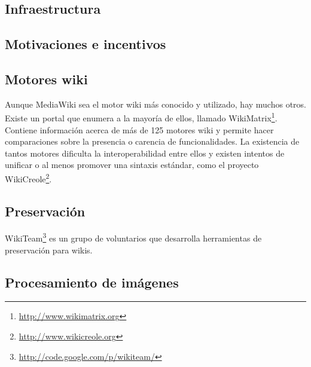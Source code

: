 \documentclass[11pt,onecolumn]{article}
\begin{document}
\subsection{Infraestructura}




\subsection{Motivaciones e incentivos}



\subsection{Motores wiki}

Aunque MediaWiki sea el motor wiki más conocido y utilizado, hay muchos otros. Existe un portal que enumera a la mayoría de ellos, llamado WikiMatrix\footnote{\href{http://www.wikimatrix.org}{http://www.wikimatrix.org}}. Contiene información acerca de más de 125 motores wiki y permite hacer comparaciones sobre la presencia o carencia de funcionalidades. La existencia de tantos motores dificulta la interoperabilidad entre ellos y existen intentos de unificar o al menos promover una sintaxis estándar, como el proyecto WikiCreole\footnote{\href{http://www.wikicreole.org}{http://www.wikicreole.org}}.

\subsection{Preservación}





WikiTeam\footnote{\href{http://code.google.com/p/wikiteam/}{http://code.google.com/p/wikiteam/}} es un grupo de voluntarios que desarrolla herramientas de preservación para wikis.

\subsection{Procesamiento de imágenes}
\end{document}
